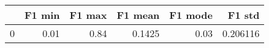 \begin{tabular}{lrrrrr}
\toprule
{} &  F1 min &  F1 max &  F1 mean &  F1 mode &    F1 std \\
\midrule
0 &    0.01 &    0.84 &   0.1425 &     0.03 &  0.206116 \\
\bottomrule
\end{tabular}
